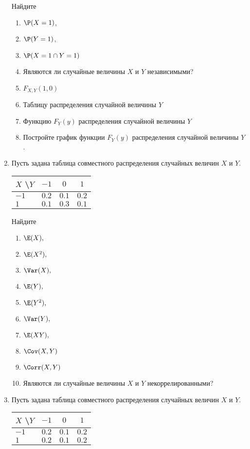 \begin{enumerate}
Найдите
\begin{enumerate}
\item $\P(X = 1)$,
\item $\P(Y = 1)$,
\item $\P(X = 1 \cap Y = 1)$
\item Являются ли случайные величины $X$ и $Y$ независимыми?
\item $F_{X,Y}(1,0)$
\item Таблицу распределения случайной величины $Y$
\item Функцию $F_{Y}(y)$ распределения случайной величины $Y$
\item Постройте график функции $F_{Y}(y)$ распределения случайной величины $Y$.
\end{enumerate}

\item Пусть задана таблица совместного распределения случайных величин $X$ и $Y$.

\begin{center}\begin{tabular}{lccc}
\toprule
 $X$ \textbackslash $Y$    & $-1$  & $0$   & $1$   \\ \midrule
$-1$                 & $0.2$ & $0.1$ & $0.2$ \\
 $1$                 & $0.1$ & $0.3$ & $0.1$ \\ \bottomrule
\end{tabular}\end{center}

Найдите
\begin{enumerate}
    \item $\E(X),$
    \item $\E(X^{2}),$
	\item $\Var(X),$
    \item $\E(Y),$
    \item $\E(Y^{2}),$
    \item $\Var(Y),$
    \item $\E(XY),$
	\item $\Cov(X,Y)$
    \item $\Corr(X,Y)$
    \item Являются ли случайные величины $X$ и $Y$ некоррелированными?
\end{enumerate}

\item Пусть задана таблица совместного распределения случайных величин $X$ и $Y$.

\begin{center}\begin{tabular}{lccc}
\toprule
 $X$ \textbackslash $Y$    & $-1$  &$ 0 $  & $1 $  \\ \midrule
$-1$                 & $0.2$ & $0.1$ & $0.2$ \\
 $1$                 & $0.2$ & $0.1$ & $0.2$ \\ \bottomrule
\end{tabular}\end{center}


\end{enumerate}
